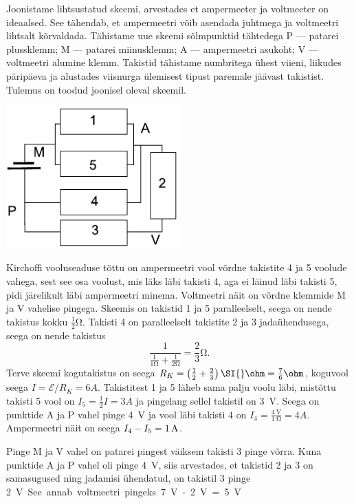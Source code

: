 {\ifSolution
Joonistame lihtsustatud skeemi, arvestades et ampermeeter ja voltmeeter 
on ideaalsed. See tähendab, et ampermeetri võib asendada juhtmega ja 
voltmeetri lihtsalt kõrvaldada. Tähistame uue skeemi sõlmpunktid 
tähtedega P --- patarei plussklemm; M --- patarei miinusklemm; A --- 
ampermeetri asukoht; V --- voltmeetri alumine klemm. Takistid tähistame 
numbritega ühest viieni, liikudes päripäeva ja alustades viisnurga 
ülemisest tipust paremale jäävast takistist. Tulemus on toodud joonisel 
oleval skeemil.
\begin{center}
	\includegraphics[width=0.5\textwidth]{2017-v3g-06-viisnurk-lah}
\end{center}
Kirchoffi vooluseaduse tõttu on ampermeetri vool võrdne 
takistite 4 ja 5 voolude vahega, sest see osa voolust, mis läks läbi takisti 4, aga ei läinud läbi takisti 5, pidi järelikult läbi ampermeetri minema. Voltmeetri näit on võrdne klemmide 
M ja V vahelise pingega.
Skeemis on takistid 1 ja 5 paralleelselt, seega on nende takistus kokku $\frac12 \si{\ohm}$. Takisti 4 on paralleelselt 
takistite 2 ja 3 jadaühendusega, seega on nende takistus
$$\frac{1}{\frac{1}{1\si{\ohm}}+\frac{1}{2\si{\ohm}}} = \frac 23 \si{\ohm}. $$
Terve skeemi kogutakistus on seega $R_K=\left(\frac 12 + 
\frac 23\right)\SI{}\ohm=\frac 76\ohm$, koguvool seega $I=\mathcal 
E/R_K=\SI{6}A$. Takistitest 1 ja 5 läheb sama palju voolu läbi,
mistõttu takisti 5 vool on $I_5=\frac 12 I=\SI{3}A$ ja pingelang sellel takistil on \SI{3}{\volt}. Seega on punktide A ja P vahel pinge \SI{4}{\volt} ja vool läbi takisti 4 
on $I_4=\frac{\SI{4}{\volt}}{\SI{1}{\ohm}}=\SI{4}A$. Ampermeetri
näit on seega $I_4-I_5=\SI 1A$.

Pinge M ja V vahel on patarei pingest väiksem takisti 3 pinge võrra. Kuna punktide A ja P vahel oli pinge \SI{4}{\volt}, siis arvestades, et takistid 2 ja 3 on samasugused ning jadamisi ühendatud, on takistil 3 pinge \SI{2}V. 
See annab voltmeetri pingeks
\SI{7}V -\SI{2}V= \SI{5}V.
\fi


}
